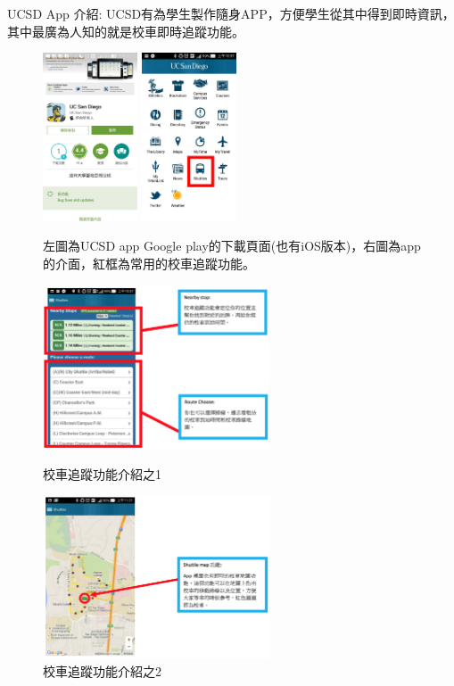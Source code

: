\documentclass[10pt,a4paper]{book}
\begin{document}
\begin{CJK}{UTF8}{bkai}
UCSD App 介紹:
UCSD有為學生製作隨身APP，方便學生從其中得到即時資訊，其中最廣為人知的就是校車即時追蹤功能。

\begin{figure}
\centering
\includegraphics[width=0.25\textwidth]{Pics/shuttle_1}
\includegraphics[width=0.25\textwidth]{Pics/shuttle_2}
\caption{左圖為UCSD app Google play的下載頁面(也有iOS版本)，右圖為app的介面，紅框為常用的校車追蹤功能。
}
\includegraphics[width=0.6\textwidth]{Pics/shuttle_3}
\caption{校車追蹤功能介紹之1} \label{fig:shuttle_3}
\includegraphics[width=0.6\textwidth]{Pics/shuttle_4}
\caption{校車追蹤功能介紹之2} \label{fig:shuttle_4}
\end{figure}


\end{CJK}
\end{document}
